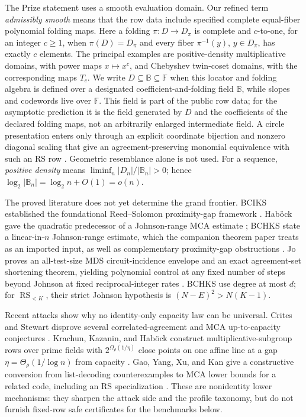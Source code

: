 \documentclass[a4paper,11pt]{amsart}
\theoremstyle{remark}
\DeclareMathOperator{\RS}{RS}
\newcommand{\F}{\mathbb F}
\newcommand{\B}{\mathbb B}
\newcommand{\abs}[1]{\lvert#1\rvert}
\begin{document}
The Prize statement uses a smooth evaluation domain.  Our refined term
\emph{admissibly smooth} means that the row data include specified complete
equal-fiber polynomial folding maps.  Here a folding \(\pi:D\to D_\pi\) is
complete and \(c\)-to-one, for an integer \(c\ge1\), when
\(\pi(D)=D_\pi\) and every fiber
\(\pi^{-1}(y)\), \(y\in D_\pi\), has exactly \(c\) elements.  The principal examples are
positive-density multiplicative domains, with power maps \(x\mapsto x^c\),
and Chebyshev twin-coset domains, with the corresponding maps \(T_c\).  We
write \(D\subseteq\B\subseteq\F\) when this locator and folding algebra is
defined over a designated coefficient-and-folding field \(\B\), while slopes
and codewords live over \(\F\).  This field is part of the public row data;
for the asymptotic prediction it is the field generated by \(D\) and the
coefficients of the declared folding maps, not an arbitrarily enlarged
intermediate field.  A circle presentation enters only through an explicit
coordinate bijection and nonzero diagonal scaling that give an
agreement-preserving monomial equivalence with such an RS row
\cite{HLP24,ChoShortening}.  Geometric resemblance alone is not used.
For a sequence, \emph{positive density} means
\(\liminf_n\abs{D_n}/\abs{\B_n}>0\); hence
\(\log_2\abs{\B_n}=\log_2n+O(1)=o(n)\).

The proved literature does not yet determine the grand frontier.  BCIKS
established the foundational Reed--Solomon proximity-gap framework
\cite{BCIKS20}.  Hab\"ock gave the quadratic predecessor of a Johnson-range
MCA estimate \cite{Habock25}; BCHKS state a linear-in-\(n\) Johnson-range
estimate, which the companion theorem paper treats as an imported input,
as well as complementary proximity-gap obstructions \cite{BCHKS25}.  Jo
proves an all-test-size MDS circuit-incidence envelope and an exact
agreement-set shortening theorem, yielding polynomial control at any fixed
number of steps beyond Johnson at fixed reciprocal-integer rates
\cite{Jo26}.  BCHKS use degree at most \(d\); for \(\RS_{<K}\), their strict
Johnson hypothesis is \((N-E)^2>N(K-1)\).

Recent attacks show why no identity-only capacity law can be universal.
Crites and Stewart disprove several correlated-agreement and MCA
up-to-capacity conjectures \cite{CritesStewart25}.  Krachun, Kazanin, and
Hab\"ock construct multiplicative-subgroup rows over prime fields with
\(2^{\Omega_\rho(1/\eta)}\) close points on one affine line at a gap
\(\eta=\Theta_\rho(1/\log n)\) from capacity \cite{KKH26}.  Gao, Yang, Xu,
and Kan give a constructive conversion from list-decoding counterexamples to
MCA lower bounds for a related code, including an RS specialization
\cite{GaoYangXuKan26}.  These are nonidentity lower mechanisms: they sharpen
the attack side and the profile taxonomy, but do not furnish fixed-row safe
certificates for the benchmarks below.
\end{document}
